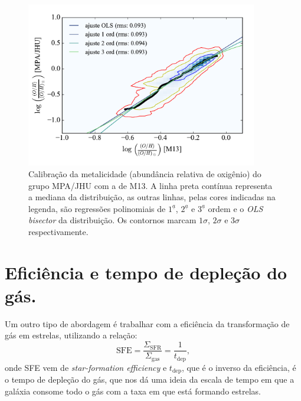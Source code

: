 \begin{figure}
	\centering
	\includegraphics[width=0.9\textwidth]{figuras/logOH_ZnebMPA.pdf}
	\caption[Calibração das metalicidades.]
	{Calibração da metalicidade (abundância relativa de oxigênio) do grupo MPA/JHU com a de M13. A
linha preta contínua representa a mediana da distribuição, as outras linhas, pelas cores indicadas
na legenda, são regressões polinomiais de $1^\underline{a}$, $2^\underline{a}$ e $3^\underline{a}$
ordem e o {\em OLS bisector} da distribuição. Os contornos marcam $1\sigma$, $2\sigma$ e $3\sigma$
respectivamente.}
	\label{fig:calibZ}
\end{figure}

\section{Eficiência e tempo de depleção do gás.}
\label{sec:gasfrac:SFE}

Um outro tipo de abordagem é trabalhar com a eficiência da transformação de gás em estrelas,
utilizando a relação:
\begin{equation}
	\mathrm{SFE} = \frac{\Sigma_{\mathrm{SFR}}}{\Sigma_{\mathrm{gas}}} = \frac{1}{t_{\mathrm{dep}}},
	\label{eq:SFE}
\end{equation}
\noindent onde SFE vem de {\em star-formation efficiency} e $t_{\mathrm{dep}}$, que é o inverso da
eficiência, é o tempo de depleção do gás, que nos dá uma ideia da escala de tempo em que a galáxia
consome todo o gás com a taxa em que está formando estrelas.


